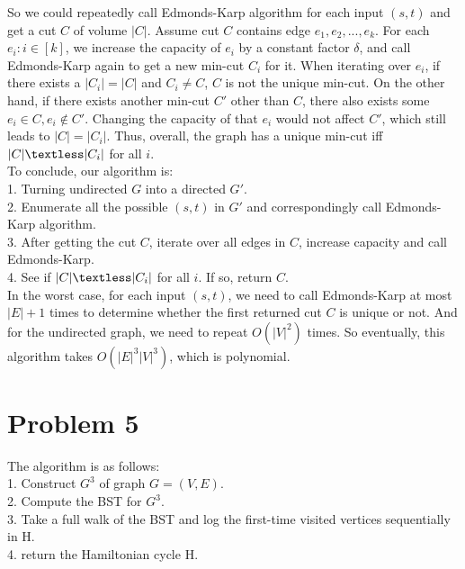 \documentclass[titlepage, paper=a4, fontsize=11pt]{scrartcl} %
\numberwithin{equation}{section} %
\numberwithin{figure}{section} %
\numberwithin{table}{section} %
\begin{document}
So we could repeatedly call Edmonds-Karp algorithm for each input $(s, t)$ and get a cut $C$ of volume $|C|$. Assume cut $C$ contains edge $e_1, e_2, ... , e_k$. For each $e_i: i \in [k]$, we increase the capacity of $e_i$ by a constant factor $\delta$, and call Edmonds-Karp again to get a new min-cut $C_i$ for it. When iterating over $e_i$, if there exists a $|C_i|=|C|$ and $C_i \neq C$, $C$ is not the unique min-cut. On the other hand, if there exists another min-cut $C'$ other than $C$, there also exists some $e_i \in C, e_i \notin C'$. Changing the capacity of that $e_i$ would not affect $C'$, which still leads to $|C|=|C_i|$. Thus, overall, the graph has a unique min-cut iff $|C| \textless |C_i|$ for all $i$. \\

To conclude, our algorithm is: \\
1. Turning undirected $G$ into a directed $G'$. \\
2. Enumerate all the possible $(s, t)$ in $G'$ and correspondingly call Edmonds-Karp algorithm. \\
3. After getting the cut $C$, iterate over all edges in $C$, increase capacity and call Edmonds-Karp. \\
4. See if $|C| \textless |C_i|$ for all $i$. If so, return $C$. \\

In the worst case, for each input $(s, t)$, we need to call Edmonds-Karp at most $|E|+1$ times to determine whether the first returned cut $C$ is unique or not. And for the undirected graph, we need to repeat $O(|V|^2)$ times. So eventually, this algorithm takes $O(|E|^3|V|^3)$, which is polynomial. \\




\section*{Problem 5}
The algorithm is as follows: \\
1. Construct $G^3$ of graph $G = (V, E)$. \\
2. Compute the BST for $G^3$. \\
3. Take a full walk of the BST and log the first-time visited vertices sequentially in H. \\
4. return the Hamiltonian cycle H. \\
\end{document}
